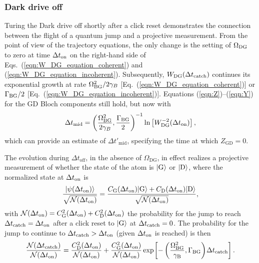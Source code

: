 \documentclass[
						superscriptaddress, 																 amsmath, amssymb,
		 aps,  prb,  
										floatfix,
		linenumbers,
			]{revtex4-1}
\begin{document}
\subsubsection{Dark drive off}
Turing the Dark drive off shortly after a click reset demonstrates the connection between the flight of a quantum jump and a projective measurement. From the point of view of the trajectory equations, the only change is the setting of $\Omega_{\rm DG}$ to zero at time $\Delta t_{\rm on}$ on the right-hand side of Eqs.~(\ref{eqn:W_DG_equation_coherent}) and (\ref{eqn:W_DG_equation_incoherent}). Subsequently, $W_{\rm DG}(\Delta t_{\rm catch})$ continues its exponential growth at rate $\Omega_{\rm BG}^2/2\gamma_B$ [Eq.~(\ref{eqn:W_DG_equation_coherent})] or $\Gamma_{\rm BG}/2$ [Eq.~(\ref{eqn:W_DG_equation_incoherent})]. Equations (\ref{eqn:Z})--(\ref{eqn:Y})   for the GD Bloch components still hold, 
but now with
\begin{equation}
\Delta t_{\rm mid}=\left(\frac{\Omega_{\rm BG}^2}{2\gamma_B},\frac{\Gamma_{\rm BG}}2\right)^{-1}\ln\big[W_{\rm DG}^{ -2}(\Delta t_{\rm on})\big]\,,
\end{equation}
which can provide an estimate of $\Delta t'_\mathrm{mid}$, specifying the time at which $Z_\mathrm{GD} = 0$.

The evolution during $\Delta t_\mathrm{off}$, in the absence of $\Omega_\mathrm{DG}$, in effect realizes a projective measurement of whether the state of the atom is $|{\rm G}\rangle$ or $|{\rm D}\rangle$, where the normalized state at $\Delta t_{\rm on}$ is
\begin{equation}
\frac{|\psi(\Delta t_{\rm on})\rangle}{\sqrt{{\cal N}(\Delta t_{\rm on})}}=\frac{C_{\rm G}(\Delta t_{\rm on})|{\rm G}\rangle+C_{\rm D}(\Delta t_{\rm on})|{\rm D}\rangle}{\sqrt{{\cal N}(\Delta t_{\rm on})}},
\label{eqn:initial_state}
\end{equation}
with ${\cal N}(\Delta t_{\rm on})=C_{\rm G}^2(\Delta t_{\rm on})+C_{\rm D}^2(\Delta t_{\rm on})$ the probability for the jump to reach $\Delta t_{\rm catch}=\Delta t_{\rm on}$ after a click reset to $|{\rm G}\rangle$ at $\Delta t_{\rm catch}=0$. The probability for the jump to continue to $\Delta t_{\rm catch}>\Delta t_{\rm on}$ (given $\Delta t_{\rm on}$ is reached) is then
\begin{equation}
\label{eq:completion-prob}
\frac{{\cal N}(\Delta t_{\rm catch})}{{\cal N}(\Delta t_{\rm on})}=\frac{C_{\rm D}^2(\Delta t_{\rm on})}{{\cal N}(\Delta t_{\rm on})}+\frac{C_{\rm G}^2(\Delta t_{\rm on})}{{\cal N}(\Delta t_{\rm on})}\exp\mkern-2mu\left[-\left(\frac{\Omega_{\rm BG}^2}{\gamma_{\rm B}},\Gamma_{\rm BG}\right)\mkern-2mu\Delta t_{\rm catch}\right].
\end{equation}
\end{document}
